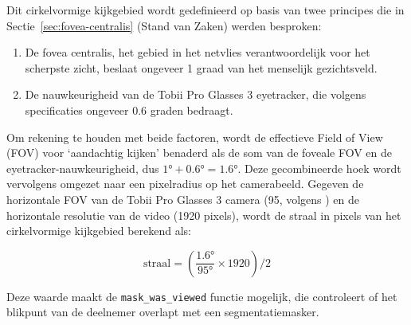 Dit cirkelvormige kijkgebied wordt gedefinieerd op basis van twee principes die in 
Sectie~\ref{sec:fovea-centralis} (Stand van Zaken) werden besproken:
\begin{enumerate}
    \item De fovea centralis, het gebied in het netvlies verantwoordelijk voor het scherpste zicht, beslaat ongeveer 1 graad van het menselijk gezichtsveld.
    \item De nauwkeurigheid van de Tobii Pro Glasses 3 eyetracker, die volgens specificaties ongeveer 0.6 graden bedraagt.
\end{enumerate}

Om rekening te houden met beide factoren, wordt de effectieve Field of View (FOV) voor 
`aandachtig kijken' benaderd als de som van de foveale FOV en de eyetracker-nauwkeurigheid, dus \(1° + 0.6° = 1.6° \).
Deze gecombineerde hoek wordt vervolgens omgezet naar een pixelradius op het camerabeeld. 
Gegeven de horizontale FOV van de Tobii Pro Glasses 3 camera (95\textdegree, volgens \textcite{tobii_pro_glasses_3}) en de horizontale resolutie van de video (1920 pixels),
wordt de straal in pixels van het cirkelvormige kijkgebied berekend als:

\[
\text{straal} = \left( \frac{\text{1.6°}}{\text{95°}} \times \text{1920} \right) / 2
\]

Deze waarde maakt de \texttt{mask\_was\_viewed} functie mogelijk, die controleert of het blikpunt van de deelnemer overlapt met een segmentatiemasker.


